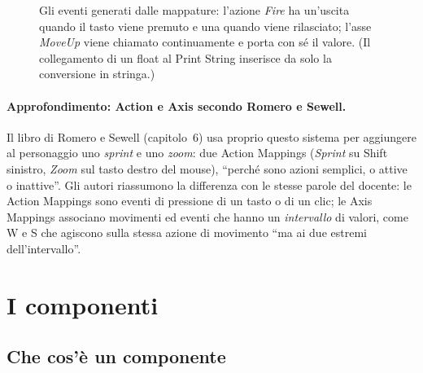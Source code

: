\begin{figure}[htbp]
\centering
\begin{bpgraph}
\end{bpgraph}
\caption{Gli eventi generati dalle mappature: l'azione \emph{Fire} ha
un'uscita quando il tasto viene premuto e una quando viene rilasciato; l'asse
\emph{MoveUp} viene chiamato continuamente e porta con sé il valore. (Il
collegamento di un float al Print String inserisce da solo la conversione in
stringa.)}
\label{gd13:fig:input}
\end{figure}

\paragraph{Approfondimento: Action e Axis secondo Romero e Sewell.} Il libro di
Romero e Sewell (capitolo~6) usa proprio questo sistema per aggiungere al
personaggio uno \emph{sprint} e uno \emph{zoom}: due Action Mappings
(\emph{Sprint} su Shift sinistro, \emph{Zoom} sul tasto destro del mouse),
``perché sono azioni semplici, o attive o inattive''. Gli autori riassumono la
differenza con le stesse parole del docente: le Action Mappings sono eventi di
pressione di un tasto o di un clic; le Axis Mappings associano movimenti ed
eventi che hanno un \emph{intervallo} di valori, come W e S che agiscono sulla
stessa azione di movimento ``ma ai due estremi dell'intervallo''.

\section{I componenti}
\label{gd13:sec:componenti}

\subsection{Che cos'è un componente}

